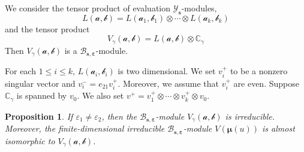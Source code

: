 \documentclass[11pt,reqno]{amsart}
\numberwithin{equation}{section}
\newtheorem{prop}[thm]{Proposition}
\theoremstyle{definition}
\theoremstyle{remark}
\newcommand{\C}{\mathbb{C}}
\newcommand{\mc}{\mathcal}
\newcommand{\bC}{\mathbb{C}}
\newcommand{\lle}{\leqslant}
\newcommand{\YMN}{{\mathscr{Y}_{\bm s}}}
\newcommand{\BMN}{{\mathscr{B}_{\bm s,\bm \ve}}}
\newcommand{\ve}{\varepsilon}
\begin{document}
We consider the tensor product of evaluation $\YMN$-modules,
\[
L(\bm{\mc a,\mc b})=L(\mc a_1,\mc b_1)\otimes \cdots\otimes L(\mc a_k,\mc b_k)
\]
and the tensor product
\[
V_{\gamma}(\bm{\mc a,\mc b})=L(\bm{\mc a,\mc b})\otimes \bC_{\gamma}
\]
Then $V_{\gamma}(\bm{\mc a,\mc b})$ is a $\BMN$-module.

For each $1\lle i\lle k$, $L(\mc a_i,\mc b_i)$ is two dimensional. We set $v_i^+$ to be a nonzero singular vector and $v_i^-=e_{21}v_i^+$. Moreover, we assume that $v_i^+$ are even. Suppose $\C_\gamma$ is spanned by $v_0$. We also set  $v^+=v_1^+\otimes\cdots\otimes v_k^+\otimes v_0^{}$.
\begin{prop}
If $\ve_1\ne \ve_2$, then the  $\BMN$-module $V_{\gamma}(\bm{\mc a,\mc b})$ is irreducible. Moreover, the finite-dimensional irreducible $\BMN$-module $V(\bm\mu(u))$ is almost isomorphic to $V_{\gamma}(\bm{\mc a,\mc b})$.
\end{prop}
\end{document}
